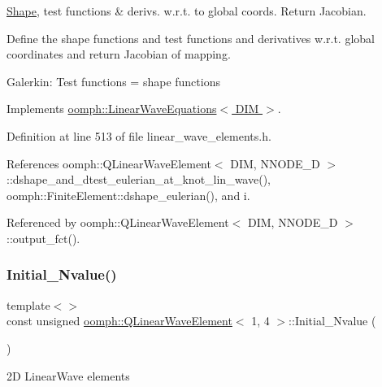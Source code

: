 \hyperlink{classoomph_1_1Shape}{Shape}, test functions \& derivs. w.\+r.\+t. to global coords. Return Jacobian. 

Define the shape functions and test functions and derivatives w.\+r.\+t. global coordinates and return Jacobian of mapping.

Galerkin\+: Test functions = shape functions 

Implements \hyperlink{classoomph_1_1LinearWaveEquations_a57ed864bd1ecad66fc115bf3b956e4c6}{oomph\+::\+Linear\+Wave\+Equations$<$ D\+I\+M $>$}.



Definition at line 513 of file linear\+\_\+wave\+\_\+elements.\+h.



References oomph\+::\+Q\+Linear\+Wave\+Element$<$ D\+I\+M, N\+N\+O\+D\+E\+\_\+D $>$\+::dshape\+\_\+and\+\_\+dtest\+\_\+eulerian\+\_\+at\+\_\+knot\+\_\+lin\+\_\+wave(), oomph\+::\+Finite\+Element\+::dshape\+\_\+eulerian(), and i.



Referenced by oomph\+::\+Q\+Linear\+Wave\+Element$<$ D\+I\+M, N\+N\+O\+D\+E\+\_\+D $>$\+::output\+\_\+fct().

\mbox{\label{classoomph_1_1QLinearWaveElement_a7574b4cc7ca4e9b778e6b72aa26d362e}} 
\subsubsection{\texorpdfstring{Initial\+\_\+\+Nvalue()}{Initial\_Nvalue()}\hspace{0.1cm}{\footnotesize\ttfamily [1/9]}}
{\footnotesize\ttfamily template$<$$>$ \\
const unsigned \hyperlink{classoomph_1_1QLinearWaveElement}{oomph\+::\+Q\+Linear\+Wave\+Element}$<$ 1, 4 $>$\+::Initial\+\_\+\+Nvalue (\begin{DoxyParamCaption}{ }\end{DoxyParamCaption})\hspace{0.3cm}{\ttfamily [private]}}



2D Linear\+Wave elements 



